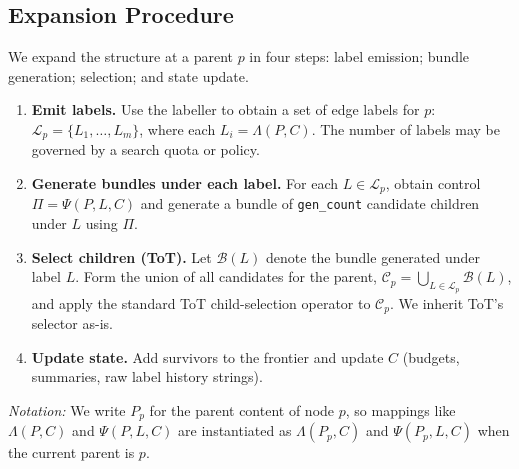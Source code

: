 \documentclass{article}
\theoremstyle{plain}
\theoremstyle{definition}
\theoremstyle{remark}
\begin{document}
\subsection{Expansion Procedure}
We expand the structure at a parent $p$ in four steps: label emission; bundle generation; selection; and state update.
\begin{enumerate}
  \item \textbf{Emit labels.} Use the labeller to obtain a set of edge labels for $p$:
  $\mathcal{L}_p = \{L_1,\dots,L_m\}$, where each $L_i=\Lambda(P,C)$. The number of labels may be governed by a search quota or policy.
  \item \textbf{Generate bundles under each label.} For each $L\in\mathcal{L}_p$, obtain control $\Pi=\Psi(P,L,C)$ and generate a bundle of \texttt{gen\_count} candidate children under $L$ using $\Pi$.
  \item \textbf{Select children (ToT).} Let $\mathcal{B}(L)$ denote the bundle generated under label $L$. Form the union of all candidates for the parent, $\mathcal{C}_p=\bigcup_{L\in\mathcal{L}_p}\mathcal{B}(L)$, and apply the standard ToT child-selection operator to $\mathcal{C}_p$. We inherit ToT's selector as-is.
  \item \textbf{Update state.} Add survivors to the frontier and update $C$ (budgets, summaries, raw label history strings).
\end{enumerate}

\noindent\textit{Notation:} We write $P_p$ for the parent content of node $p$, so mappings like $\Lambda(P,C)$ and $\Psi(P,L,C)$ are instantiated as $\Lambda(P_p,C)$ and $\Psi(P_p,L,C)$ when the current parent is $p$.
\end{document}
